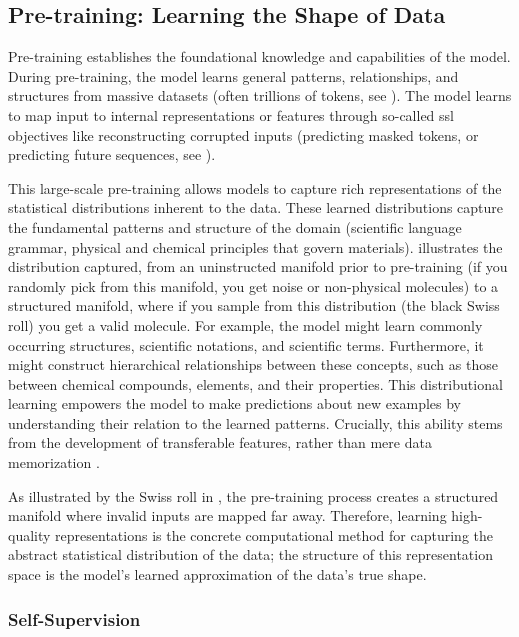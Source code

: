 \subsection{Pre-training: Learning the Shape of Data}
\label{sec:pretraining}

Pre-training establishes the foundational knowledge and capabilities of the model. 
During pre-training, the model learns general patterns, relationships, and structures from massive datasets (often trillions of tokens, see ). 
The model learns to map input to internal representations or features through so-called \gls{ssl} objectives like reconstructing corrupted inputs (predicting masked tokens, or predicting future sequences, see ). 

This large-scale pre-training allows models to capture rich representations of the statistical distributions inherent to the data.  These learned distributions capture the fundamental patterns and structure of the domain (scientific language grammar, physical and chemical principles that govern materials).  illustrates the distribution captured, from an uninstructed manifold prior to pre-training (if you randomly pick from this manifold, you get noise or non-physical molecules) to a structured manifold, where if you sample from this distribution (the black Swiss roll) you get a valid molecule.
For example, the model might learn commonly occurring structures, scientific notations, and scientific terms. 
Furthermore, it might construct hierarchical relationships between these concepts, such as those between chemical compounds, elements, and their properties.  
This distributional learning empowers the model to make predictions about new examples by understanding their relation to the learned patterns. Crucially, this ability stems from the development of transferable features, rather than mere data memorization \autocite{brown2020language}. 

As illustrated by the Swiss roll in , the pre-training process creates a structured manifold where invalid inputs are mapped far away. Therefore, learning high-quality representations is the concrete computational method for capturing the abstract statistical distribution of the data; the structure of this representation space is the model's learned approximation of the data's true shape.

\subsubsection{Self-Supervision} \label{sec:ssl}

